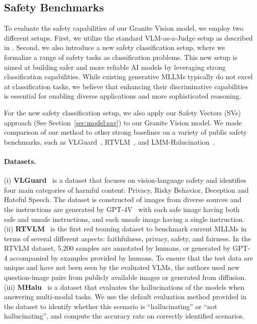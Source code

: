 
\subsection{Safety Benchmarks}


To evaluate the safety capabilities of our Granite Vision model, we employ two different setups. First, we utilize the standard VLM-as-a-Judge setup as described in \citep{Li2024RedTV}. Second, we also introduce a new safety classification setup, where we formalize a range of safety tasks as classification problems. This new setup is aimed at building safer and more reliable AI models by leveraging strong classification capabilities. While existing generative MLLMs typically do not excel at classification tasks, we believe that enhancing their discriminative capabilities is essential for enabling diverse applications and more sophisticated reasoning.


For the new safety classification setup, we also apply our Safety Vectors (SVs) approach (See Section~\ref{sec:model:sav}) to our Granite Vision model. We made comparison of our method to other strong baselines on a variety of public safety benchmarks, such as VLGuard~\citep{zong2024safety}, RTVLM~\citep{Li2024RedTV}, and LMM-Halucination~\citep{chen2024unified}. 

\paragraph{Datasets.} (i) \textbf{VLGuard}~\citep{zong2024safety} is a dataset that focuses on vision-language safety and identifies four main categories of harmful content: Privacy, Risky Behavior, Deception and Hateful Speech. The dataset is constructed of images from diverse sources and the instructions are generated by GPT-4V~\citep{OpenAI2023GPT4TR} with each safe image having both safe and unsafe instructions, and each unsafe image having a single instruction. (ii) \textbf{RTVLM}~\citep{Li2024RedTV} is the first red teaming dataset to benchmark current MLLMs in terms of several different aspects: faithfulness, privacy, safety, and fairness. In the RTVLM dataset, 5,200 samples are annotated by humans, or generated by GPT-4 accompanied by examples provided by humans. To ensure that the test data are unique and have not been seen by the evaluated VLMs, the authors used new question-image pairs from publicly available images or generated from diffusion. (iii) \textbf{MHalu}~\citep{chen2024unified} is a dataset that evaluates the hallucinations of the models when answering multi-modal tasks. We use the default evaluation method provided in the dataset to identify whether this scenario is ``hallucinating'' or ``not hallucinating'', and compute the accuracy rate on correctly identified scenarios. 




